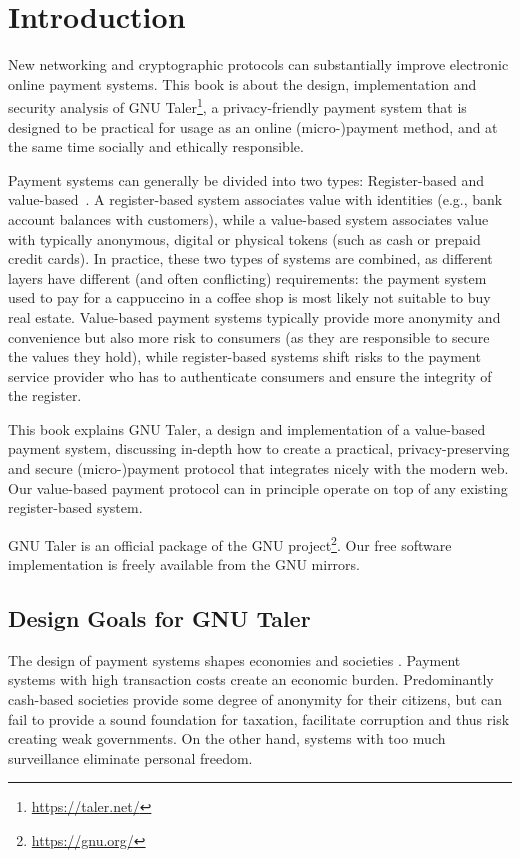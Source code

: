 \chapter{Introduction}\label{chapter:introduction}

New networking and cryptographic protocols can substantially improve
electronic online payment systems.  This book is about the design,
implementation and security analysis of GNU
Taler\footnote{\url{https://taler.net/}}, a privacy-friendly payment
system that is designed to be practical for usage as an online
(micro-)payment method, and at the same time socially and ethically
responsible.

Payment systems can generally be divided into two types: Register-based
and value-based~\cite{riksbank2017riksbank}.  A register-based system
associates value with identities (e.g., bank account balances with
customers), while a value-based system associates value with typically
anonymous, digital or physical tokens (such as cash or prepaid credit
cards).  In practice, these two types of systems are combined, as
different layers have different (and often conflicting) requirements:
the payment system used to pay for a cappuccino in a coffee shop is
most likely not suitable to buy real estate.  Value-based payment
systems typically provide more anonymity and convenience but also more
risk to consumers (as they are responsible to secure the values they
hold), while register-based systems shift risks to the payment service
provider who has to authenticate consumers and ensure the integrity of
the register.

This book explains GNU Taler, a design and implementation of a value-based
payment system, discussing in-depth how to create a practical,
privacy-preserving and secure (micro-)payment protocol that integrates nicely
with the modern web.  Our value-based payment protocol can in principle
operate on top of any existing register-based system.

GNU Taler is an official package of the GNU
project\footnote{\url{https://gnu.org/}}.  Our free software implementation is
freely available from the GNU mirrors.


\section{Design Goals for GNU Taler}

The design of payment systems shapes economies and societies
\cite{zandi2013impact,dalebrant2016monetary}.  Payment systems with high
transaction costs create an economic burden.  Predominantly cash-based
societies provide some degree of anonymity for their citizens, but can fail to
provide a sound foundation for taxation, facilitate corruption
\cite{singh2017does} and thus risk creating weak governments. On the other
hand, systems with too much surveillance eliminate personal freedom.

